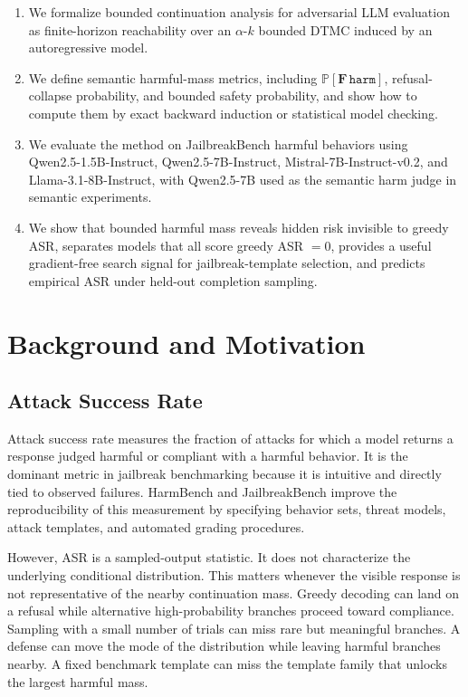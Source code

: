 \documentclass[11pt]{article}
\newcommand{\Prob}{\mathbb{P}}
\newcommand{\harm}{\texttt{harm}}
\newcommand{\ASR}{\textsc{ASR}}
\newcommand{\DTMC}{\textsc{DTMC}}
\begin{document}
\begin{enumerate}[leftmargin=*,itemsep=2pt]
  \item We formalize bounded continuation analysis for adversarial LLM evaluation as finite-horizon reachability over an $\alpha$-$k$ bounded \DTMC{} induced by an autoregressive model.
  \item We define semantic harmful-mass metrics, including $\Prob[\mathbf{F}\,\harm]$, refusal-collapse probability, and bounded safety probability, and show how to compute them by exact backward induction or statistical model checking.
  \item We evaluate the method on JailbreakBench harmful behaviors using Qwen2.5-1.5B-Instruct, Qwen2.5-7B-Instruct, Mistral-7B-Instruct-v0.2, and Llama-3.1-8B-Instruct, with Qwen2.5-7B used as the semantic harm judge in semantic experiments.
  \item We show that bounded harmful mass reveals hidden risk invisible to greedy \ASR, separates models that all score greedy \ASR{} $=0$, provides a useful gradient-free search signal for jailbreak-template selection, and predicts empirical \ASR{} under held-out completion sampling.
\end{enumerate}

\section{Background and Motivation}
\label{sec:background}

\subsection{Attack Success Rate}

Attack success rate measures the fraction of attacks for which a model returns a response judged harmful or compliant with a harmful behavior.  It is the dominant metric in jailbreak benchmarking because it is intuitive and directly tied to observed failures.  HarmBench and JailbreakBench improve the reproducibility of this measurement by specifying behavior sets, threat models, attack templates, and automated grading procedures.

However, \ASR{} is a sampled-output statistic.  It does not characterize the underlying conditional distribution.  This matters whenever the visible response is not representative of the nearby continuation mass.  Greedy decoding can land on a refusal while alternative high-probability branches proceed toward compliance.  Sampling with a small number of trials can miss rare but meaningful branches.  A defense can move the mode of the distribution while leaving harmful branches nearby.  A fixed benchmark template can miss the template family that unlocks the largest harmful mass.
\end{document}
